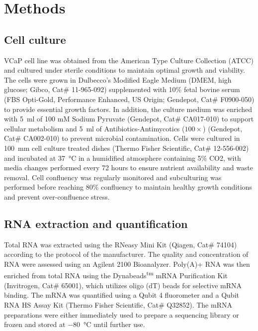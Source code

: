 \documentclass[pdflatex,sn-nature, lineno]{sn-jnl}%
\theoremstyle{thmstyleone}%
\theoremstyle{thmstyletwo}%
\theoremstyle{thmstylethree}%
\begin{document}
\section{Methods}\label{sec:methods}

\subsection{Cell culture}

VCaP cell line was obtained from the American Type Culture Collection (ATCC) and cultured under sterile conditions to maintain optimal growth and viability.
The cells were grown in Dulbecco's Modified Eagle Medium (DMEM, high glucose; Gibco, Cat\# 11-965-092) supplemented with 10\% fetal bovine serum (FBS Opti-Gold, Performance Enhanced, US Origin; Gendepot, Cat\# F0900-050) to provide essential growth factors.
In addition, the culture medium was enriched with \SI{5}{\ml} of 100 mM Sodium Pyruvate (Gendepot, Cat\# CA017-010) to support cellular metabolism and \SI{5}{\ml} of Antibiotics-Antimycotics (\( 100\times \)) (Gendepot, Cat\# CA002-010) to prevent microbial contamination.
Cells were cultured in \SI{100}{\mm} cell culture treated dishes (Thermo Fisher Scientific, Cat\# 12-556-002) and incubated at \SI{37}{\degreeCelsius} in a humidified atmosphere containing 5\% CO2, with media changes performed every 72 hours to ensure nutrient availability and waste removal.
Cell confluency was regularly monitored and subculturing was performed before reaching 80\% confluency to maintain healthy growth conditions and prevent over-confluence stress.

\subsection{RNA extraction and quantification}

Total RNA was extracted using the RNeasy Mini Kit (Qiagen, Cat\# 74104) according to the protocol of the manufacturer.
The quality and concentration of RNA were assessed using an Agilent 2100 Bioanalyzer.
Poly(A)+ RNA was then enriched from total RNA using the Dynabeads\textsuperscript{tm} mRNA Purification Kit (Invitrogen, Cat\# 65001), which utilizes oligo (dT) beads for selective mRNA binding.
The mRNA was quantified using a Qubit 4 fluorometer and a Qubit RNA HS Assay Kit (Thermo Fisher Scientific, Cat\# Q32852).
The mRNA preparations were either immediately used to prepare a sequencing library or frozen and stored at \SI{-80}{\degreeCelsius} until further use.
\end{document}
